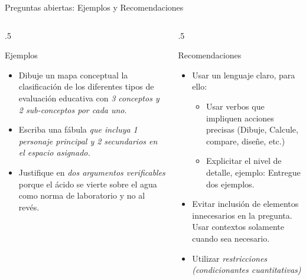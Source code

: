 \documentclass[11pt, aspectratio=169, xcolor=table,hyphens]{beamer}
\begin{document}
\begin{frame}{Preguntas abiertas: Ejemplos y Recomendaciones}
	\begin{columns}
		\begin{column}{.5\linewidth}
			\begin{exampleblock}{Ejemplos}
				\begin{itemize}[<+->]
					\small
					\item Dibuje un mapa conceptual la clasificación de los diferentes tipos de evaluación educativa con \textit{3 conceptos y 2 sub-conceptos por cada uno}.
					\item Escriba una fábula \textit{que incluya 1 personaje principal y 2 secundarios en el espacio asignado.}
					\item Justifique en \textit{dos argumentos verificables} porque el ácido se vierte sobre el agua como norma de laboratorio y no al revés.
				\end{itemize}
			\end{exampleblock}
		\end{column}
		\begin{column}{.5\linewidth}
			\begin{block}{Recomendaciones}
				\begin{itemize}
					\item<4-> Usar un lenguaje claro, para ello:
					      \begin{itemize}
						      \item<5-> Usar verbos que impliquen acciones precisas (Dibuje, Calcule, compare, diseñe, etc.)
						      \item<6-> Explicitar el nivel de detalle, ejemplo: Entregue dos ejemplos.
					      \end{itemize}
					\item<7-> Evitar inclusión de elementos innecesarios en la pregunta. Usar contextos solamente cuando sea necesario.
					\item<8-> Utilizar \textit{restricciones (condicionantes cuantitativas)}
				\end{itemize}
			\end{block}
		\end{column}
	\end{columns}
\end{frame}
\end{document}
